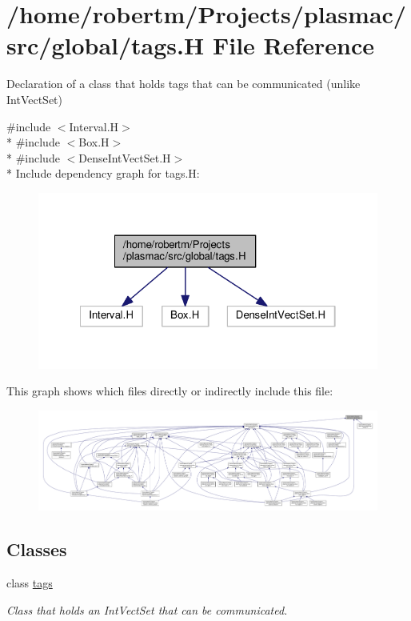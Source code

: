 \hypertarget{tags_8H}{}\section{/home/robertm/\+Projects/plasmac/src/global/tags.H File Reference}
\label{tags_8H}


Declaration of a class that holds tags that can be communicated (unlike Int\+Vect\+Set)  


{\ttfamily \#include $<$Interval.\+H$>$}\\*
{\ttfamily \#include $<$Box.\+H$>$}\\*
{\ttfamily \#include $<$Dense\+Int\+Vect\+Set.\+H$>$}\\*
Include dependency graph for tags.\+H\+:\nopagebreak
\begin{figure}[H]
\begin{center}
\leavevmode
\includegraphics[width=322pt]{tags_8H__incl}
\end{center}
\end{figure}
This graph shows which files directly or indirectly include this file\+:\nopagebreak
\begin{figure}[H]
\begin{center}
\leavevmode
\includegraphics[width=350pt]{tags_8H__dep__incl}
\end{center}
\end{figure}
\subsection*{Classes}
\begin{DoxyCompactItemize}
\item 
class \hyperlink{classtags}{tags}
\begin{DoxyCompactList}\small\item\em Class that holds an Int\+Vect\+Set that can be communicated. \end{DoxyCompactList}\end{DoxyCompactItemize}


